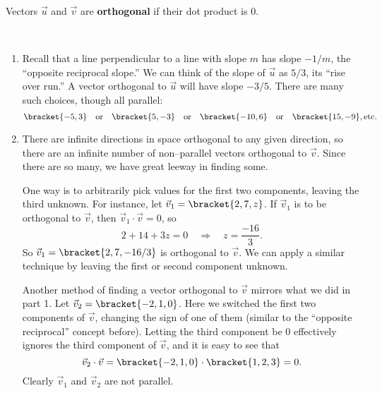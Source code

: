 {Vectors $\vec u$ and $\vec v$ are \textbf{orthogonal} if their dot product is 0.
}


{\mbox{}\\[-\baselineskip]\begin{enumerate}
	\item Recall that a line perpendicular to a line with slope $m$ has slope $-1/m$, the ``opposite reciprocal slope.'' We can think of the slope of $\vec u$ as $5/3$, its ``rise over run.'' A vector orthogonal to $\vec u$ will have slope $-3/5$. There are many such choices, though all parallel:
	\[\bracket{-5,3}\quad \text{or} \quad\bracket{5,-3}\quad \text{or} \quad \bracket{-10,6}\quad \text{or} \quad \bracket{15,-9},\text{etc.}\]
	\item		There are infinite directions in space orthogonal to any given direction, so there are an infinite number of non--parallel vectors orthogonal to $\vec v$. Since there are so many, we have great leeway in finding some.
	
	One way is to arbitrarily pick values for the first two components, leaving the third unknown. For instance, let $\vec v_1 = \bracket{2,7,z}$. If $\vec v_1$ is to be orthogonal to $\vec v$, then $\vec v_1\cdot\vec v = 0$, so 
	\[2+14+3z=0 \quad \Rightarrow \quad z = \frac{-16}{3}.\]
	So $\vec v_1 = \bracket{2, 7, -16/3}$ is orthogonal to $\vec v$. We can apply a similar technique by leaving the first or second component unknown.
	
	Another method of finding a vector orthogonal to $\vec v$ mirrors what we did in part 1. Let $\vec v_2 = \bracket{-2,1,0}$. Here we switched the first two components of $\vec v$, changing the sign of one of them (similar to the ``opposite reciprocal'' concept before). Letting the third component be 0 effectively ignores the third component of $\vec v$, and it is easy to see that 
	\[\vec v_2\cdot\vec v = \bracket{-2,1,0}\cdot\bracket{1,2,3}= 0.\]
	Clearly $\vec v_1$ and $\vec v_2$ are not parallel.\eoehere
\end{enumerate}}

